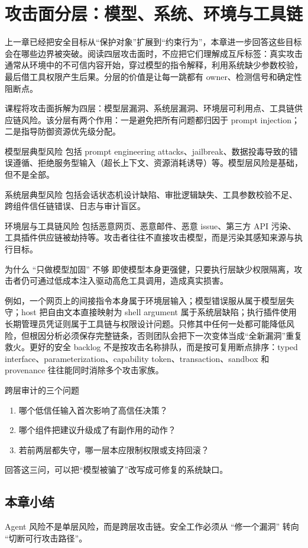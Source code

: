 \section{攻击面分层：模型、系统、环境与工具链}

上一章已经把安全目标从“保护对象”扩展到“约束行为”，本章进一步回答这些目标会在哪些边界被突破。阅读四层攻击面时，不应把它们理解成互斥标签：真实攻击通常从环境中的不可信内容开始，穿过模型的指令解释，利用系统缺少参数校验，最后借工具权限产生后果。分层的价值是让每一跳都有 owner、检测信号和确定性阻断点。

课程将攻击面拆解为四层：模型层漏洞、系统层漏洞、环境层可利用点、工具链供应链风险。该分层有两个作用：一是避免把所有问题都归因于 prompt injection；二是指导防御资源优先级分配。

\begin{knowledgebox}{模型层典型风险}
包括 prompt engineering attacks、jailbreak、数据投毒导致的错误遵循、拒绝服务型输入（超长上下文、资源消耗诱导）等。模型层风险是基础，但不是全部。
\end{knowledgebox}

\begin{knowledgebox}{系统层典型风险}
包括会话状态机设计缺陷、审批逻辑缺失、工具参数校验不足、跨组件信任链错误、日志与审计盲区。
\end{knowledgebox}

\begin{knowledgebox}{环境层与工具链风险}
包括恶意网页、恶意邮件、恶意 issue、第三方 API 污染、工具插件供应链被劫持等。攻击者往往不直接攻击模型，而是污染其感知来源与执行目标。
\end{knowledgebox}

\begin{warningbox}{为什么 ``只做模型加固'' 不够}
即使模型本身更强健，只要执行层缺少权限隔离，攻击者仍可通过低成本注入驱动高危工具调用，造成真实损害。
\end{warningbox}

例如，一个网页上的间接指令本身属于环境层输入；模型错误服从属于模型层失守；host 把自由文本直接映射为 shell argument 属于系统层缺陷；执行插件使用长期管理员凭证则属于工具链与权限设计问题。只修其中任何一处都可能降低风险，但根因分析必须保存完整链条，否则团队会把下一次变体当成“全新漏洞”重复救火。更好的安全 backlog 不是按攻击名称排队，而是按可复用断点排序：typed interface、parameterization、capability token、transaction、sandbox 和 provenance 往往能同时消除多个攻击家族。

\begin{knowledgebox}{跨层审计的三个问题}
\begin{enumerate}
    \item 哪个低信任输入首次影响了高信任决策？
    \item 哪个组件把建议升级成了有副作用的动作？
    \item 若前两层都失守，哪一层本应限制权限或支持回滚？
\end{enumerate}
回答这三问，可以把“模型被骗了”改写成可修复的系统缺口。
\end{knowledgebox}

\subsection{本章小结}
Agent 风险不是单层风险，而是跨层攻击链。安全工作必须从 ``修一个漏洞'' 转向 ``切断可行攻击路径''。

